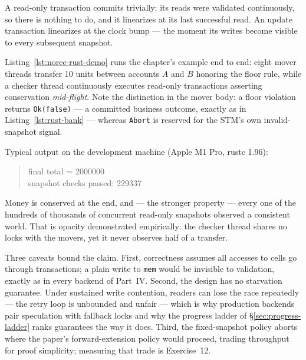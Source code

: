 A read-only transaction commits trivially: its reads were validated
continuously, so there is nothing to do, and it linearizes at its last
successful read. An update transaction linearizes at the clock bump ---
the moment its writes become visible to every subsequent snapshot.

Listing~\ref{lst:norec-rust-demo} runs the chapter's example end to end:
eight mover threads transfer 10 units between accounts $A$ and $B$
honoring the floor rule, while a checker thread continuously executes
read-only transactions asserting conservation \emph{mid-flight}. Note the
distinction in the mover body: a floor violation returns
\texttt{Ok(false)} --- a committed business outcome, exactly as in
Listing~\ref{lst:rust-bank} --- whereas \texttt{Abort} is reserved for the
STM's own invalid-snapshot signal.



Typical output on the development machine (Apple M1 Pro, rustc 1.96):

\begin{quote}
\small\ttfamily
final total = 2000000\\
snapshot checks passed: 229337
\end{quote}

Money is conserved at the end, and --- the stronger property --- every one
of the hundreds of thousands of concurrent read-only snapshots observed a
consistent world. That is opacity demonstrated empirically: the checker
thread shares no locks with the movers, yet it never observes half of a
transfer.

Three caveats bound the claim. First, correctness assumes all accesses to
cells go through transactions; a plain write to \texttt{mem} would be
invisible to validation, exactly as in every backend of Part~IV.
Second, the design has no starvation guarantee. Under sustained write
contention, readers can lose the race repeatedly --- the retry loop is
unbounded and unfair --- which is why production backends pair speculation
with fallback locks and why the progress ladder of
\S\ref{sec:progress-ladder} ranks guarantees the way it does. Third, the
fixed-snapshot policy aborts where the paper's forward-extension policy
would proceed, trading throughput for proof simplicity; measuring that
trade is Exercise~12.

